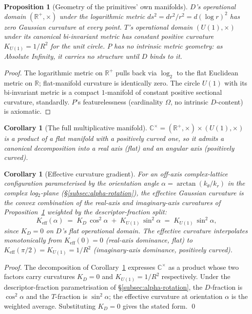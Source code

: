 \documentclass[11pt,a4paper]{article}
\newtheorem{corollary}[theorem]{Corollary}
\newtheorem{proposition}[theorem]{Proposition}
\theoremstyle{definition}
\theoremstyle{remark}
\newcommand{\R}{\mathbb{R}}
\newcommand{\C}{\mathbb{C}}
\begin{document}
\begin{proposition}[Geometry of the primitives' own manifolds]\label{prop:primitive-geometries}
$D$'s operational domain $(\R^{+},\times)$ under the logarithmic metric $ds^{2} = dr^{2}/r^{2} = d(\log r)^{2}$ has zero Gaussian curvature at every point. $T$'s operational domain $(U(1),\times)$ under its canonical bi-invariant metric has constant positive curvature $K_{U(1)} = 1/R^{2}$ for the unit circle. $P$ has no intrinsic metric geometry: as Absolute Infinity, it carries no structure until $D$ binds to it.
\end{proposition}

\begin{proof}
The logarithmic metric on $\R^{+}$ pulls back via $\log_{2}$ to the flat Euclidean metric on $\R$; flat-manifold curvature is identically zero. The circle $U(1)$ with its bi-invariant metric is a compact $1$-manifold of constant positive sectional curvature, standardly. $P$'s featurelessness (cardinality $\Omega$, no intrinsic $D$-content) is axiomatic.
\end{proof}

\begin{corollary}[The full multiplicative manifold]\label{cor:CMinus0}
$\C^{\times} = (\R^{+},\times)\times(U(1),\times)$ is a product of a flat manifold with a positively curved one, so it admits a canonical decomposition into a real axis (flat) and an angular axis (positively curved).
\end{corollary}

\begin{corollary}[Effective curvature gradient]\label{cor:K-eff}
For an off-axis complex-lattice configuration parameterised by the orientation angle $\alpha = \arctan(k_{\theta}/k_{r})$ in the complex log$_{2}$-plane (\S\ref{subsec:alpha-rotation}), the effective Gaussian curvature is the convex combination of the real-axis and imaginary-axis curvatures of Proposition~\ref{prop:primitive-geometries} weighted by the descriptor-fraction split:
\[
K_{\mathrm{eff}}(\alpha) \;=\; K_{D}\,\cos^{2}\alpha \;+\; K_{U(1)}\,\sin^{2}\alpha \;=\; K_{U(1)}\,\sin^{2}\alpha,
\]
since $K_{D} = 0$ on $D$'s flat operational domain. The effective curvature interpolates monotonically from $K_{\mathrm{eff}}(0) = 0$ (real-axis dominance, flat) to $K_{\mathrm{eff}}(\pi/2) = K_{U(1)} = 1/R^{2}$ (imaginary-axis dominance, positively curved).
\end{corollary}

\begin{proof}
The decomposition of Corollary~\ref{cor:CMinus0} expresses $\C^{\times}$ as a product whose two factors carry curvatures $K_{D} = 0$ and $K_{U(1)} = 1/R^{2}$ respectively. Under the descriptor-fraction parametrisation of \S\ref{subsec:alpha-rotation}, the $D$-fraction is $\cos^{2}\alpha$ and the $T$-fraction is $\sin^{2}\alpha$; the effective curvature at orientation $\alpha$ is the weighted average. Substituting $K_{D} = 0$ gives the stated form. \qed
\end{proof}
\end{document}
